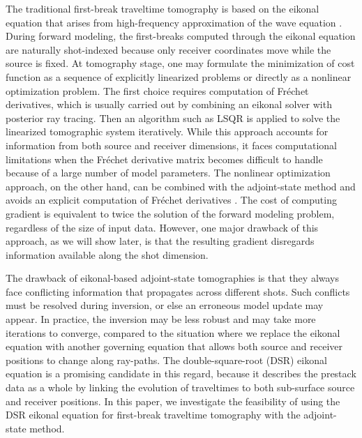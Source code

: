 The traditional first-break traveltime tomography is based on the eikonal equation that arises from 
high-frequency approximation of the wave equation \cite[]{chapman}. During forward modeling, the first-breaks 
computed through the eikonal equation are naturally shot-indexed because only receiver coordinates 
move while the source is fixed. At tomography stage, one may formulate the minimization of cost 
function as a sequence of explicitly linearized problems or directly as a nonlinear optimization problem. 
The first choice \cite[]{zelt,zhu1,dessa,pei} requires computation of Fr\'{e}chet derivatives, which is usually 
carried out by combining an eikonal solver with posterior ray tracing. Then an algorithm such as LSQR 
\cite[]{paige} is applied to solve the linearized tomographic system iteratively. While this approach accounts 
for information from both source and receiver dimensions, it faces computational limitations when the Fr\'{e}chet 
derivative matrix becomes difficult to handle because of a large number of 
model parameters. The nonlinear optimization approach, on the other hand, can be combined with the adjoint-state 
method \cite[]{plessix} and avoids an explicit computation of Fr\'{e}chet derivatives \cite[]{taillandier}. The 
cost of computing gradient is equivalent to twice the solution of the forward modeling problem, regardless of the 
size of input data. However, one major drawback of this approach, as we will show later, is that the resulting 
gradient disregards information available along the shot dimension.

The drawback of eikonal-based adjoint-state tomographies is that they
always face conflicting information that propagates across different
shots. Such conflicts must be resolved during inversion, or else an
erroneous model update may appear. In practice, the inversion may be
less robust and may take more iterations to converge, compared to the
situation where we replace the eikonal equation with another governing
equation that allows both source and receiver positions to change
along ray-paths. The double-square-root (DSR) eikonal equation is a
promising candidate in this regard, because it describes the prestack
data as a whole by linking the evolution of traveltimes to both
sub-surface source and receiver positions. In this paper, we
investigate the feasibility of using the DSR eikonal equation for
first-break traveltime tomography with the adjoint-state method.

